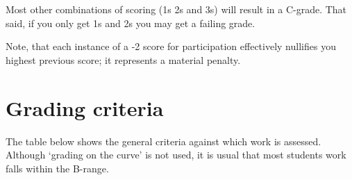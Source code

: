 \documentclass[]{book}
\theoremstyle{definition}
\theoremstyle{definition}
\theoremstyle{definition}
\theoremstyle{remark}
\begin{document}
Most other combinations of scoring (1s 2s and 3s) will result in a
C-grade. That said, if you only get 1s and 2s you may get a failing
grade.

Note, that each instance of a -2 score for participation effectively
nullifies you highest previous score; it represents a material penalty.

\hypertarget{grading-criteria}{%
\section{Grading criteria}\label{grading-criteria}}

The table below shows the general criteria against which work is
assessed. Although `grading on the curve' is not used, it is usual that
most students work falls within the B-range.
\end{document}
